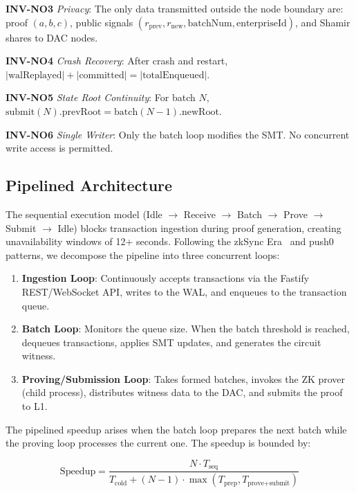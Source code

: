 \smallskip\noindent\textbf{INV-NO3} \emph{Privacy}: The only data transmitted outside
the node boundary are: proof $(a, b, c)$, public signals
$(r_\text{prev}, r_\text{new}, \text{batchNum}, \text{enterpriseId})$,
and Shamir shares to DAC nodes.

\smallskip\noindent\textbf{INV-NO4} \emph{Crash Recovery}: After crash and restart,
$|\text{walReplayed}| + |\text{committed}| = |\text{totalEnqueued}|$.

\smallskip\noindent\textbf{INV-NO5} \emph{State Root Continuity}: For batch $N$,
$\text{submit}(N).\text{prevRoot} = \text{batch}(N-1).\text{newRoot}$.

\smallskip\noindent\textbf{INV-NO6} \emph{Single Writer}: Only the batch loop
modifies the SMT. No concurrent write access is permitted.

\subsection{Pipelined Architecture}

The sequential execution model (Idle $\to$ Receive $\to$ Batch $\to$
Prove $\to$ Submit $\to$ Idle) blocks transaction ingestion during proof
generation, creating unavailability windows of 12+ seconds. Following
the zkSync Era~\cite{zksync2025lifecycle} and push0~\cite{push0_2025orchestration}
patterns, we decompose the pipeline into three concurrent loops:

\begin{enumerate}
\item \textbf{Ingestion Loop}: Continuously accepts transactions via the
  Fastify REST/WebSocket API, writes to the WAL, and enqueues to the
  transaction queue.

\item \textbf{Batch Loop}: Monitors the queue size. When the batch
  threshold is reached, dequeues transactions, applies SMT updates,
  and generates the circuit witness.

\item \textbf{Proving/Submission Loop}: Takes formed batches, invokes
  the ZK prover (child process), distributes witness data to the DAC,
  and submits the proof to L1.
\end{enumerate}

The pipelined speedup arises when the batch loop prepares the next
batch while the proving loop processes the current one. The speedup
is bounded by:

\begin{equation}
\text{Speedup} = \frac{N \cdot T_\text{seq}}{T_\text{cold} + (N-1) \cdot \max(T_\text{prep}, T_\text{prove+submit})}
\end{equation}

